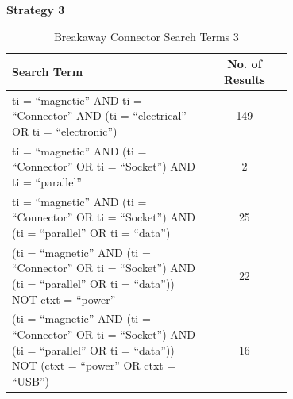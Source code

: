\documentclass [12pt]{article}
\begin{document}
\textbf{Strategy 3}
\begin{table}[H]
    \centering
    \setlength{\arrayrulewidth}{1.5pt}
    \begin{tabular}{|p{0.7\linewidth}|c|}
    \hline
    \cellcolor{gray!40}Search Term & \cellcolor{gray!40}No. of Results \\
    \hline
    ti = “magnetic” AND ti = “Connector” AND (ti = “electrical” OR ti = “electronic”) & 149 \\
    \hline
    ti = “magnetic” AND (ti = “Connector” OR ti = “Socket”) AND ti = “parallel” & 2 \\
    \hline
    ti = “magnetic” AND (ti = “Connector” OR ti = “Socket”) AND (ti = “parallel” OR ti = “data”) & 25 \\
    \hline
    (ti = “magnetic” AND (ti = “Connector” OR ti = “Socket”) AND (ti = “parallel” OR ti = “data”)) NOT ctxt = “power” & 22 \\
    \hline
    (ti = “magnetic” AND (ti = “Connector” OR ti = “Socket”) AND (ti = “parallel” OR ti = “data”)) NOT (ctxt = “power” OR ctxt = “USB”) & 16\\
    \hline
    \end{tabular}
    \caption{Breakaway Connector Search Terms 3}
    \label{table:breakaway_connector_search_strat_3}
\end{table}
\end{document}
